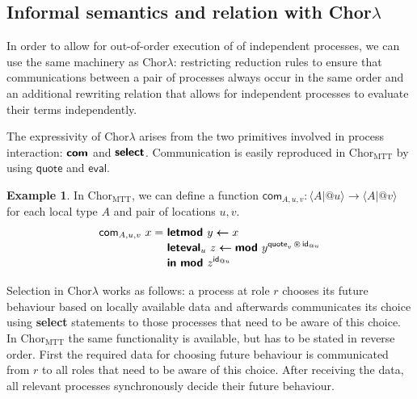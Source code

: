 \documentclass{scrartcl}
\theoremstyle{definition}
\newtheorem{example}{Example}
\theoremstyle{plain}
\newcommand{\primitive}[1]{\textsf{\textbf{#1}}}
\newcommand{\ChorMTT}{Chor${}_{\textrm{MTT}}$}
\begin{document}
\subsection{Informal semantics and relation with
  \texorpdfstring{Chor$\lambda$}{ChorLambda}}
In order to allow for out-of-order execution of of independent processes, we
can use the same machinery as Chor$\lambda$: restricting reduction rules to
ensure that communications between a pair of processes always occur in the same
order and an additional rewriting relation that allows for independent
processes to evaluate their terms independently.

The expressivity of Chor$\lambda$ arises from the two primitives involved in
process interaction: $\primitive{com}$ and $\primitive{select}$. Communication
is easily reproduced in \ChorMTT{} by using $\textsf{quote}$ and
$\textsf{eval}$.
\begin{example}
  In \ChorMTT, we can define a function $\textsf{com}_{A,u,v} : \langle A | @u
  \rangle \to \langle A | @v \rangle$ for each local type $A$ and pair of
  locations $u,v$.
  \begin{align*}
    \textsf{com}_{A,u,v}\ x =
    \ & \primitive{letmod } y \bm{\leftarrow} x\\[-3pt]
      & \primitive{leteval}_u\ z \bm{\leftarrow} \primitive{mod }
        y^{\textsf{quote}_v \,\circledast\, \textsf{id}_{@u}}\\[-3pt]
      & \primitive{in } \primitive{mod } z^{\textsf{id}_{@u}}
  \end{align*}
\end{example}
\noindent
Selection in Chor$\lambda$ works as follows: a process at role $r$ chooses its
future behaviour based on locally available data and afterwards communicates
its choice using \primitive{select} statements to those processes that need to
be aware of this choice. In \ChorMTT{} the same functionality is available, but
has to be stated in reverse order. First the required data for choosing future
behaviour is communicated from $r$ to all roles that need to be aware of this
choice. After receiving the data, all relevant processes synchronously decide
their future behaviour.
\end{document}
